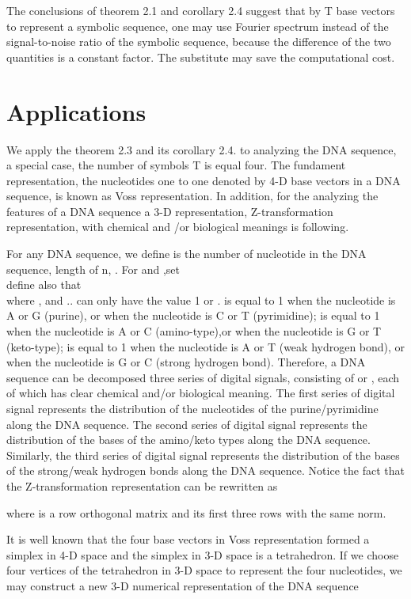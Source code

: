 \documentclass[preprint,authoryear,12pt]{elsarticle}
\begin{document}
The conclusions of theorem 2.1 and corollary 2.4 suggest that by T base vectors to represent a symbolic sequence, one may use Fourier spectrum instead of the signal-to-noise ratio of the symbolic sequence, because the difference of the two quantities is a constant factor. The substitute may save the computational cost.

\section{Applications}
We apply the theorem 2.3 and its corollary 2.4. to analyzing the DNA sequence, a special case, the number of symbols T  is equal four. The fundament representation, the nucleotides one to one denoted by 4-D base vectors in a DNA sequence, is known as Voss representation\citep{VOSS1993}. In addition, for the analyzing the features of a DNA sequence a 3-D representation, Z-transformation representation, with chemical and /or biological meanings is following\citep{ZHANG1998}.

For any DNA sequence, we define   is the number of  nucleotide  in the DNA sequence, length of n, . For  and  ,set\\

 define also that\\
 
where , and ..   can only have the value 1 or .   is equal to 1 when the  nucleotide is A or G (purine), or  when the   nucleotide is C or T (pyrimidine);  is equal to 1 when the  nucleotide is A or C (amino-type),or  when the  nucleotide is G or T (keto-type);   is equal to 1 when the  nucleotide is A or T (weak hydrogen bond), or when the  nucleotide is G or C (strong hydrogen bond). Therefore, a DNA sequence can be decomposed three series of digital signals, consisting of  or , each of which has clear chemical and/or biological meaning. The first series of digital signal  represents the distribution of the nucleotides of the purine/pyrimidine along the DNA sequence. The second series of digital signal represents the distribution of the bases of the amino/keto types along the DNA sequence. Similarly, the third series of digital signal   represents the distribution of the bases of the strong/weak hydrogen bonds along the DNA sequence. Notice the fact that the Z-transformation representation \citep{ZHANG1998} can be rewritten as

where     is a row orthogonal matrix and its first three rows with the same norm.

It is well known that the four base vectors in Voss representation \citep{VOSS1993} formed a simplex in 4-D space and the simplex in 3-D space is a tetrahedron\citep{SILVERMAN1986}. If we choose four vertices of the tetrahedron in 3-D space to represent the four nucleotides, we may construct a new 3-D numerical representation of the DNA sequence
\end{document}
